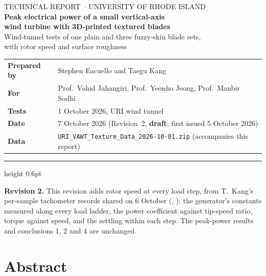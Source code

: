 \documentclass[11pt]{article}
\newcommand{\ReportDate}{7 October 2026}
\begin{document}
\thispagestyle{empty}
\begin{flushleft}
{\sffamily\small\color{ink2} TECHNICAL REPORT \quad·\quad UNIVERSITY OF RHODE ISLAND}\\[0.8em]
{\sffamily\LARGE\bfseries\color{navy} Peak electrical power of a small vertical-axis\\[0.15em]
wind turbine with 3D-printed textured blades}\\[0.5em]
{\sffamily\large Wind-tunnel tests of one plain and three fuzzy-skin blade sets,\\[0.1em]
with rotor speed and surface roughness}\\[1.0em]
{\small
\begin{tabular}{@{}ll@{}}
\textbf{Prepared by} & Stephen Eacuello and Taegu Kang \\
\textbf{For}         & Prof.\ Vahid Jahangiri, Prof.\ Yeonho Jeong, Prof.\ Manbir Sodhi \\
\textbf{Tests}       & 1 October 2026, URI wind tunnel \\
\textbf{Date}        & \ReportDate{} (Revision~2, \textbf{draft}; first issued 5 October 2026) \\
\textbf{Data}        & \texttt{URI\_VAWT\_Texture\_Data\_2026-10-01.zip} (accompanies this report)
\end{tabular}}
\end{flushleft}
\vspace{0.2em}
{\color{rule}\hrule height 0.6pt}
\vspace{0.4em}
{\small\noindent\textbf{Revision 2.} This revision adds rotor speed at every load step, from
T.~Kang's per-sample tachometer records shared on 6 October (, ):
the generator's constants measured along every load ladder, the power coefficient against tip-speed
ratio, torque against speed, and the settling within each step. The peak-power results and
conclusions 1, 2 and 4 are unchanged.}

\section*{Abstract}
\end{document}
